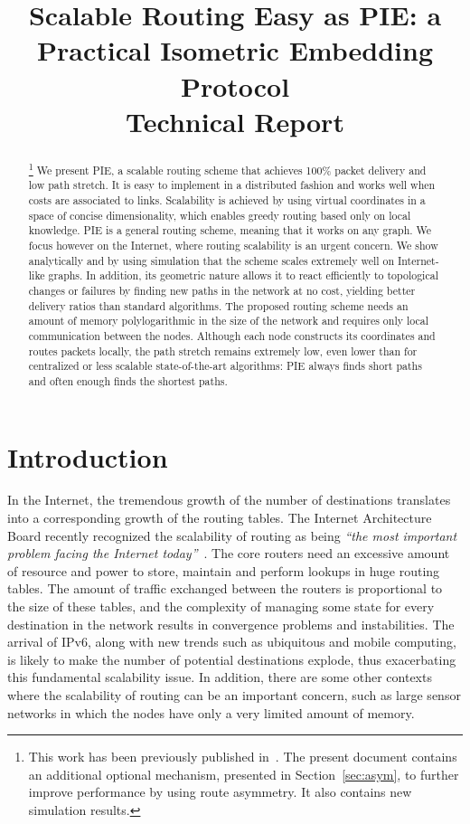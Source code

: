 \documentclass[conference]{IEEEtran}
\title{Scalable Routing Easy as PIE: a Practical Isometric Embedding Protocol\\{\large Technical Report}}
\author{\IEEEauthorblockN{Julien Herzen}
 \IEEEauthorblockA{EPFL, Lausanne, Switzerland\\
julien.herzen@epfl.ch}
\and
\IEEEauthorblockN{Cedric Westphal}
\IEEEauthorblockA{Docomo Innovations, Palo Alto, CA\\
cwestphal@docomoinnovations.com}

\and
\IEEEauthorblockN{Patrick Thiran}
\IEEEauthorblockA{EPFL, Lausanne, Switzerland\\
patrick.thiran@epfl.ch
}
}
\begin{document}
\maketitle

\begin{abstract}
\footnote{This work has been previously published in~\cite{herzen:pie}. The present document contains an additional optional mechanism, presented in Section~\ref{sec:asym}, to further improve performance by using route asymmetry. It also contains new simulation results.}
We present PIE, a scalable routing scheme that achieves 100\% packet delivery and low path stretch. It is easy to implement in a distributed fashion and works well when costs are associated to links. Scalability is achieved by using virtual coordinates in a space of concise dimensionality, which enables greedy routing based only on local knowledge. PIE is a general routing scheme, meaning that it works on any graph. We focus however on the Internet, where routing scalability is an urgent concern. We show analytically and by using simulation that the scheme scales extremely well on Internet-like graphs.
In addition, its geometric nature allows it to react efficiently to topological changes or failures by finding new paths in the network at no cost, yielding better delivery ratios than standard  
algorithms. The proposed routing scheme needs an amount of memory polylogarithmic in the size of the network and requires only local communication between the nodes. Although each node constructs its coordinates and routes packets locally, the path stretch remains extremely low, even lower than for centralized or less scalable state-of-the-art algorithms: PIE always finds short paths and often enough finds the shortest paths.
\end{abstract}

\section{Introduction}
In the Internet, the tremendous growth of the number of destinations translates into a
corresponding growth of the routing tables. The Internet Architecture Board recently recognized the scalability of routing as being \emph{``the most important problem facing the Internet today''}~\cite{iab}.
The core routers need an excessive amount of resource and power to store, maintain and perform lookups in huge routing tables. The amount of traffic exchanged between the routers is proportional to the size of these tables, and the complexity of managing some state for every destination in the network
results in convergence problems and instabilities.
The arrival of IPv6, along with new trends 
such as ubiquitous and mobile computing, 
is likely to make the number of potential destinations explode, thus exacerbating this fundamental scalability issue.
In addition, there are some other contexts where the scalability of routing can be an important concern, such as large sensor networks in which the nodes have only a very limited amount of memory.
\end{document}
